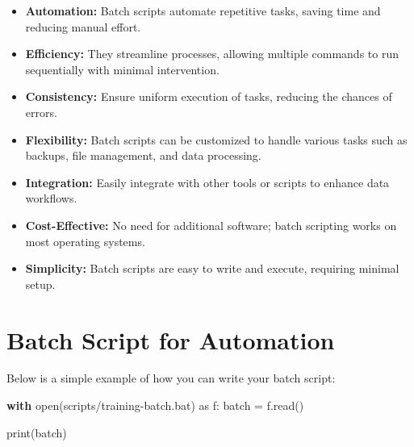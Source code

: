 \documentclass[
  letterpaper,
  DIV=11,
  numbers=noendperiod]{scrreprt}
\newenvironment{Shaded}{\begin{snugshade}}{\end{snugshade}}
\newcommand{\BuiltInTok}[1]{\textcolor[rgb]{0.00,0.23,0.31}{#1}}
\newcommand{\ControlFlowTok}[1]{\textcolor[rgb]{0.00,0.23,0.31}{\textbf{#1}}}
\newcommand{\ImportTok}[1]{\textcolor[rgb]{0.00,0.46,0.62}{#1}}
\newcommand{\NormalTok}[1]{\textcolor[rgb]{0.00,0.23,0.31}{#1}}
\newcommand{\OperatorTok}[1]{\textcolor[rgb]{0.37,0.37,0.37}{#1}}
\newcommand{\StringTok}[1]{\textcolor[rgb]{0.13,0.47,0.30}{#1}}
\begin{document}
\begin{itemize}
\item
  \textbf{Automation:} Batch scripts automate repetitive tasks, saving
  time and reducing manual effort.
\item
  \textbf{Efficiency:} They streamline processes, allowing multiple
  commands to run sequentially with minimal intervention.
\item
  \textbf{Consistency:} Ensure uniform execution of tasks, reducing the
  chances of errors.
\item
  \textbf{Flexibility:} Batch scripts can be customized to handle
  various tasks such as backups, file management, and data processing.
\item
  \textbf{Integration:} Easily integrate with other tools or scripts to
  enhance data workflows.
\item
  \textbf{Cost-Effective:} No need for additional software; batch
  scripting works on most operating systems.
\item
  \textbf{Simplicity:} Batch scripts are easy to write and execute,
  requiring minimal setup.
\end{itemize}

\section{Batch Script for Automation}\label{batch-script-for-automation}

Below is a simple example of how you can write your batch script:

\begin{Shaded}
\begin{Highlighting}[]
\ControlFlowTok{with} \BuiltInTok{open}\NormalTok{(}\StringTok{\textquotesingle{}scripts/training{-}batch.bat\textquotesingle{}}\NormalTok{) }\ImportTok{as}\NormalTok{ f:}
\NormalTok{  batch }\OperatorTok{=}\NormalTok{ f.read()}
  
\BuiltInTok{print}\NormalTok{(batch)}
\end{Highlighting}
\end{Shaded}
\end{document}
